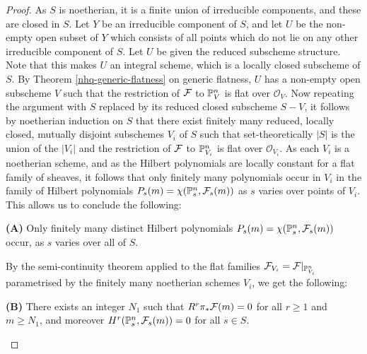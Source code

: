 \begin{proof}
As $S$ is noetherian, it is a finite union of irreducible components,
and these are closed in $S$.
Let $Y$ be an irreducible component of $S$, and let $U$ be the
non-empty open subset of $Y$ which consists of all points which do not
lie on any other irreducible component of $S$.
Let $U$ be given the reduced subscheme
structure. Note that this makes $U$ an integral scheme, which is a
locally closed subscheme of $S$.
By Theorem \ref{nhq-generic-flatness} on generic flatness,
$U$ has a non-empty open subscheme $V$ such that
the restriction of $\mathcal{F}$ to $\mathbb{P}^n_V$ is flat over ${\mathcal O}_V$.
Now repeating the argument with $S$ replaced by its reduced
closed subscheme $S-V$,
it follows by noetherian induction on $S$ that there exist
finitely many reduced, locally closed, mutually disjoint subschemes
$V_i$ of $S$ such that set-theoretically
$|S|$ is the union of the $|V_i|$ and
the restriction of $\mathcal{F}$ to $\mathbb{P}^n_{V_i}$ is flat over ${\mathcal O}_{V_i}$.
As each $V_i$ is a noetherian scheme, and as the Hilbert polynomials
are locally constant for a flat family of sheaves, it follows
that only finitely many polynomials occur in $V_i$
in the family of Hilbert polynomials $P_s(m) = \chi(\mathbb{P}^n_s,\mathcal{F}_s(m))$
as $s$ varies over points of $V_i$. This allows us to conclude
the following:

\medskip

\begin{claim}\label{nhq-finitely-many-hilbert-polynomials}
\textbf{(A) } Only finitely many distinct Hilbert polynomials
$P_s(m) = \chi(\mathbb{P}^n_s,\mathcal{F}_s(m))$ occur, as $s$
varies over all of $S$.

\end{claim}
\medskip

By the semi-continuity theorem applied to the flat families
$\mathcal{F}_{V_i} = \mathcal{F}|_{\mathbb{P}^n_{V_i}}$ para\-met\-rised by the
finitely many noetherian schemes
$V_i$, we get the following:



\medskip
\begin{claim}\label{nhq-uniform-vanishing-higher-cohomology}
\textbf{(B) } There exists an integer $N_1$ such that
$R^r\pi_*\mathcal{F}(m)=0$ for all $r\ge 1$ and $m\ge N_1$,
and moreover $H^r(\mathbb{P}^n_s,\mathcal{F}_s(m)) = 0$
for all $s\in S$.


\end{claim}
\medskip




\end{proof}
